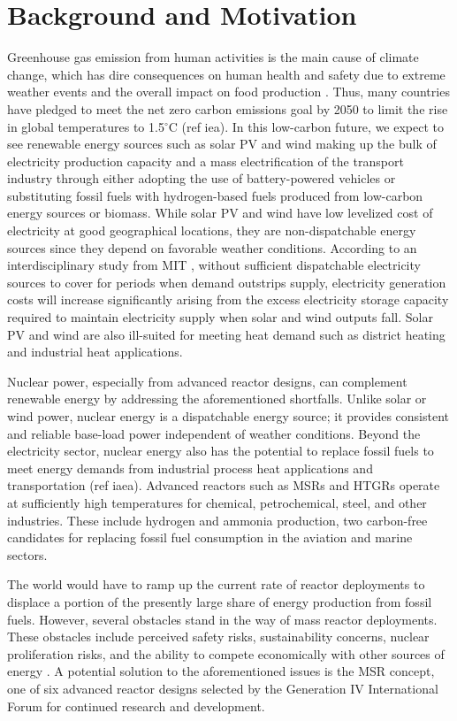 \section{Background and Motivation}

Greenhouse gas emission from human activities is the main cause of climate
change, which has dire consequences on human health and safety due to extreme
weather events and the overall impact on food production
\cite{mcmichael_global_2004}. Thus, many countries have pledged to meet the
net zero carbon emissions goal by 2050 to limit the rise in global temperatures
to 1.5$^{\circ}$C (ref iea). In this low-carbon future, we expect to see
renewable energy sources such as solar \gls{PV} and wind making up the bulk of
electricity production capacity and a mass electrification of the transport
industry through either adopting the use of battery-powered vehicles or
substituting fossil fuels with hydrogen-based fuels produced from low-carbon
energy sources or biomass. While solar \gls{PV} and wind have low levelized
cost of electricity at good geographical locations, they are non-dispatchable
energy sources since they depend on favorable weather conditions. According to
an interdisciplinary study from \gls{MIT} \cite{petti_future_2018}, without
sufficient dispatchable electricity sources to cover for periods when demand
outstrips supply, electricity generation costs will increase significantly
arising from the excess electricity storage capacity required to maintain
electricity supply when solar and wind outputs fall. Solar \gls{PV}
and wind are also ill-suited for meeting heat demand such as district heating
and industrial heat applications.

Nuclear power, especially from advanced reactor designs, can complement
renewable energy by addressing the aforementioned shortfalls. Unlike solar or
wind power, nuclear energy is a dispatchable energy source; it provides
consistent and reliable base-load power independent of weather conditions.
Beyond the electricity sector, nuclear energy also has the
potential to replace fossil fuels to meet energy demands from industrial
process heat applications and transportation (ref iaea).
Advanced reactors such as \glspl{MSR} and \glspl{HTGR} operate at sufficiently
high temperatures for chemical, petrochemical, steel, and other industries.
These include hydrogen and ammonia production, two carbon-free candidates for
replacing fossil fuel consumption in the aviation and marine sectors.

The world would have to ramp up the current rate of reactor deployments to
displace a portion of the presently large share of energy production from
fossil fuels. However, several obstacles stand in the way of mass
reactor deployments. These obstacles include perceived safety risks,
sustainability concerns, nuclear proliferation
risks, and the ability to compete economically with other sources of energy
\cite{massachusetts_institute_of_technology_future_2003}. A potential solution
to the aforementioned issues is the \gls{MSR} concept, one of six advanced
reactor designs selected by the Generation IV International Forum
\cite{gif_technology_2002} for continued research and development.

